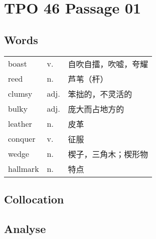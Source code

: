 \section{TPO 46 Passage 01}

\subsection{Words}

\begin{tabular}{lll}
    boast    & v.   & 自吹自擂，吹嘘，夸耀 \\
    reed     & n.   & 芦苇（杆）      \\
    clumsy   & adj. & 笨拙的，不灵活的   \\
    bulky    & adj. & 庞大而占地方的    \\
    leather  & n.   & 皮革         \\
    conquer  & v.   & 征服         \\
    wedge    & n.   & 楔子，三角木；楔形物 \\
    hallmark & n.   & 特点         \\
\end{tabular}

\subsection{Collocation}

\subsection{Analyse}

